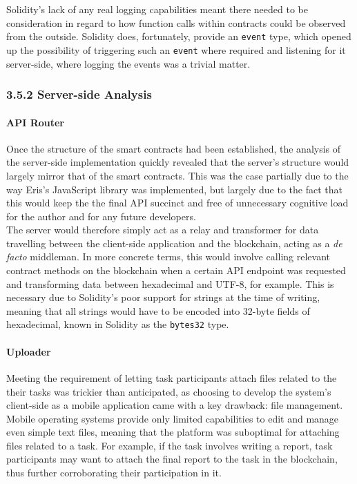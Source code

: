 \documentclass[12pt]{report}
\let\oldparagraph\paragraph
\renewcommand{\paragraph}[1]{\oldparagraph{#1}\mbox{}}
\begin{document}
Solidity's lack of any real logging capabilities meant there needed to
be consideration in regard to how function calls within contracts could
be observed from the outside. Solidity does, fortunately, provide an
\texttt{event} type, which opened up the possibility of triggering such
an \texttt{event} where required and listening for it server-side, where
logging the events was a trivial matter.

\subsubsection{3.5.2 Server-side Analysis}\label{server-side-analysis}

\paragraph{API Router}\label{api-router}

Once the structure of the smart contracts had been established, the
analysis of the server-side implementation quickly revealed that the
server's structure would largely mirror that of the smart contracts.
This was the case partially due to the way Eris's JavaScript library was
implemented, but largely due to the fact that this would keep the the
final API succinct and free of unnecessary cognitive load for the author
and for any future developers.\\
The server would therefore simply act as a relay and transformer for
data travelling between the client-side application and the blockchain,
acting as a \emph{de facto} middleman. In more concrete terms, this
would involve calling relevant contract methods on the blockchain when a
certain API endpoint was requested and transforming data between
hexadecimal and UTF-8, for example. This is necessary due to Solidity's
poor support for strings at the time of writing, meaning that all
strings would have to be encoded into 32-byte fields of hexadecimal,
known in Solidity as the \texttt{bytes32} type.

\paragraph{Uploader}\label{uploader}

Meeting the requirement of letting task participants attach files
related to the their tasks was trickier than anticipated, as choosing to
develop the system's client-side as a mobile application came with a key
drawback: file management. Mobile operating systems provide only limited
capabilities to edit and manage even simple text files, meaning that the
platform was suboptimal for attaching files related to a task. For
example, if the task involves writing a report, task participants may
want to attach the final report to the task in the blockchain, thus
further corroborating their participation in it.
\end{document}
